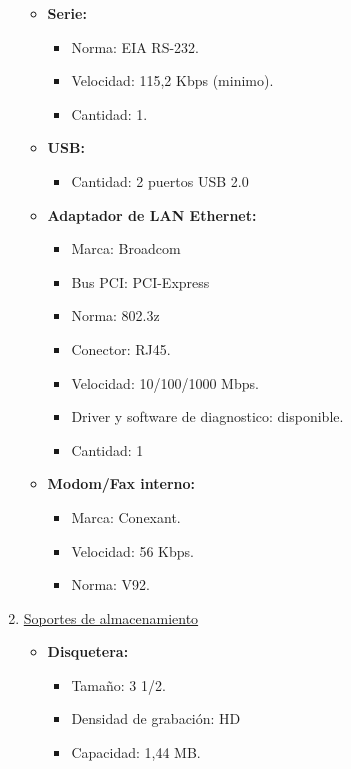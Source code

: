 \begin{enumerate}
\begin{itemize}
    \item \textbf{Serie:}
    \begin{itemize}
      \item Norma: EIA RS-232.
      \item Velocidad: 115,2 Kbps (minimo).
      \item Cantidad: 1.
    \end{itemize}
    
    \item \textbf{USB:}
    \begin{itemize}
      \item Cantidad: 2 puertos USB 2.0
    \end{itemize}
    
    \item \textbf{Adaptador de LAN Ethernet:}
    \begin{itemize}
      \item Marca: Broadcom
      \item Bus PCI: PCI-Express
      \item Norma: 802.3z
      \item Conector: RJ45.
      \item Velocidad: 10/100/1000 Mbps.
      \item Driver y software de diagnostico: disponible.
      \item Cantidad: 1
    \end{itemize}
       
    \item \textbf{Modom/Fax interno:}
    \begin{itemize}
      \item Marca: Conexant.
      \item Velocidad: 56 Kbps.
      \item Norma: V92.
    \end{itemize}
  \end{itemize}
    
  \item \underline{Soportes de almacenamiento}
  \begin{itemize}
    \item \textbf{Disquetera:}
    \begin{itemize}
      \item Tamaño: 3 1/2.
      \item Densidad de grabación: HD
      \item Capacidad: 1,44 MB.
    \end{itemize}
    

\end{itemize}
\end{enumerate}
